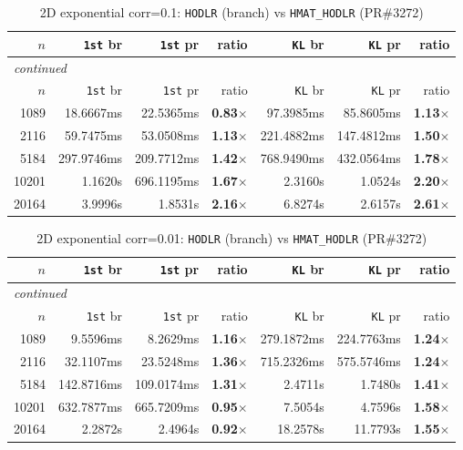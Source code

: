 \documentclass[11pt,a4paper]{article}
\begin{document}
\small\begin{center}
\begin{longtable}{rrrrrrr}
\caption{2D exponential corr=0.1: \texttt{HODLR} (branch) vs \texttt{HMAT\_HODLR} (PR\#3272)}
\\\toprule
$n$ & \texttt{1st} br & \texttt{1st} pr & ratio & \texttt{KL} br & \texttt{KL} pr & ratio\\
\midrule
\endfirsthead
\multicolumn{7}{l}{\small\emph{continued}}\\
\toprule
$n$ & \texttt{1st} br & \texttt{1st} pr & ratio & \texttt{KL} br & \texttt{KL} pr & ratio\\
\midrule
\endhead

1089 & 18.6667ms & 22.5365ms & \textbf{0.83$\times$} & 97.3985ms & 85.8605ms & \textbf{1.13$\times$}\\
2116 & 59.7475ms & 53.0508ms & \textbf{1.13$\times$} & 221.4882ms & 147.4812ms & \textbf{1.50$\times$}\\
5184 & 297.9746ms & 209.7712ms & \textbf{1.42$\times$} & 768.9490ms & 432.0564ms & \textbf{1.78$\times$}\\
10201 & 1.1620s & 696.1195ms & \textbf{1.67$\times$} & 2.3160s & 1.0524s & \textbf{2.20$\times$}\\
20164 & 3.9996s & 1.8531s & \textbf{2.16$\times$} & 6.8274s & 2.6157s & \textbf{2.61$\times$}\\
\bottomrule\end{longtable}\end{center}
\small\begin{center}
\begin{longtable}{rrrrrrr}
\caption{2D exponential corr=0.01: \texttt{HODLR} (branch) vs \texttt{HMAT\_HODLR} (PR\#3272)}
\\\toprule
$n$ & \texttt{1st} br & \texttt{1st} pr & ratio & \texttt{KL} br & \texttt{KL} pr & ratio\\
\midrule
\endfirsthead
\multicolumn{7}{l}{\small\emph{continued}}\\
\toprule
$n$ & \texttt{1st} br & \texttt{1st} pr & ratio & \texttt{KL} br & \texttt{KL} pr & ratio\\
\midrule
\endhead

1089 & 9.5596ms & 8.2629ms & \textbf{1.16$\times$} & 279.1872ms & 224.7763ms & \textbf{1.24$\times$}\\
2116 & 32.1107ms & 23.5248ms & \textbf{1.36$\times$} & 715.2326ms & 575.5746ms & \textbf{1.24$\times$}\\
5184 & 142.8716ms & 109.0174ms & \textbf{1.31$\times$} & 2.4711s & 1.7480s & \textbf{1.41$\times$}\\
10201 & 632.7877ms & 665.7209ms & \textbf{0.95$\times$} & 7.5054s & 4.7596s & \textbf{1.58$\times$}\\
20164 & 2.2872s & 2.4964s & \textbf{0.92$\times$} & 18.2578s & 11.7793s & \textbf{1.55$\times$}\\
\bottomrule\end{longtable}\end{center}
\end{document}

